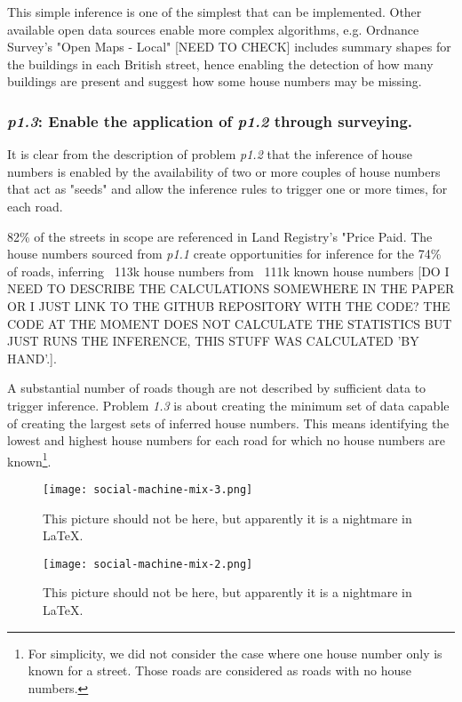         This simple inference is one of the simplest that can be implemented. Other available open data sources enable more complex algorithms, e.g. Ordnance Survey's "Open Maps - Local" [NEED TO CHECK] includes summary shapes for the buildings in each British street, hence enabling the detection of how many buildings are present and suggest how some house numbers may be missing.
        
    \subsubsection{{\it p1.3}: Enable the application of {\it p1.2} through surveying.} 

        It is clear from the description of problem {\it p1.2} that the inference of house numbers is enabled by the availability of two or more couples of house numbers that act as "seeds" and allow the inference rules to trigger one or more times, for each road.
        
        82\% of the streets in scope are referenced in Land Registry's "Price Paid. The house numbers sourced from {\it p1.1} create opportunities for inference for the 74\% of roads, inferring ~113k house numbers from ~111k known house numbers [DO I NEED TO DESCRIBE THE CALCULATIONS SOMEWHERE IN THE PAPER OR I JUST LINK TO THE GITHUB REPOSITORY WITH THE CODE? THE CODE AT THE MOMENT DOES NOT CALCULATE THE STATISTICS BUT JUST RUNS THE INFERENCE, THIS STUFF WAS CALCULATED 'BY HAND'.].  
        
        A substantial number of roads though are not described by sufficient data to trigger inference. Problem {\it 1.3} is about creating the minimum set of data capable of creating the largest sets of inferred house numbers. This means identifying the lowest and highest house numbers for each road for which no house numbers are known\footnote{For simplicity, we did not consider the case where one house number only is known for a street. Those roads are considered as roads with no house numbers.}.

        \begin{figure*}
        	\texttt{[image: social-machine-mix-3.png]}
        	\caption{This picture should not be here, but apparently it is a nightmare in LaTeX.}
        	\label{fig:social_machine_mix_3}
        \end{figure*}
        
        \begin{figure*}
        	\texttt{[image: social-machine-mix-2.png]}
        	\caption{This picture should not be here, but apparently it is a nightmare in LaTeX.}
        	\label{fig:social_machine_mix_2}
        \end{figure*}
        
